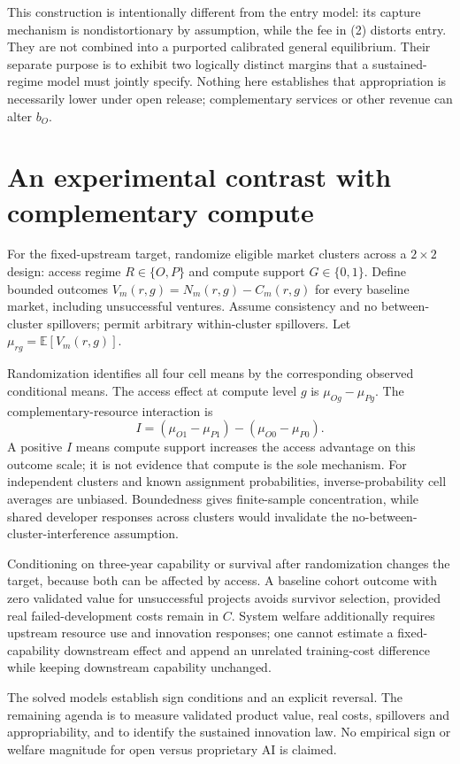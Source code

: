 \documentclass[11pt,a4paper]{article}
\newcommand{\E}{\mathbb E}
\begin{document}
This construction is intentionally different from the entry model: its capture mechanism is nondistortionary by assumption, while the fee in (2) distorts entry. They are not combined into a purported calibrated general equilibrium. Their separate purpose is to exhibit two logically distinct margins that a sustained-regime model must jointly specify. Nothing here establishes that appropriation is necessarily lower under open release; complementary services or other revenue can alter $b_O$.

\section{An experimental contrast with complementary compute}
For the fixed-upstream target, randomize eligible market clusters across a $2\times2$ design: access regime $R\in\{O,P\}$ and compute support $G\in\{0,1\}$. Define bounded outcomes $V_m(r,g)=N_m(r,g)-C_m(r,g)$ for every baseline market, including unsuccessful ventures. Assume consistency and no between-cluster spillovers; permit arbitrary within-cluster spillovers. Let $\mu_{rg}=\E[V_m(r,g)]$.

Randomization identifies all four cell means by the corresponding observed conditional means. The access effect at compute level $g$ is $\mu_{Og}-\mu_{Pg}$. The complementary-resource interaction is
\[
 I=(\mu_{O1}-\mu_{P1})-(\mu_{O0}-\mu_{P0}). \tag{4}
\]
A positive $I$ means compute support increases the access advantage on this outcome scale; it is not evidence that compute is the sole mechanism. For independent clusters and known assignment probabilities, inverse-probability cell averages are unbiased. Boundedness gives finite-sample concentration, while shared developer responses across clusters would invalidate the no-between-cluster-interference assumption.

Conditioning on three-year capability or survival after randomization changes the target, because both can be affected by access. A baseline cohort outcome with zero validated value for unsuccessful projects avoids survivor selection, provided real failed-development costs remain in $C$. System welfare additionally requires upstream resource use and innovation responses; one cannot estimate a fixed-capability downstream effect and append an unrelated training-cost difference while keeping downstream capability unchanged.

The solved models establish sign conditions and an explicit reversal. The remaining agenda is to measure validated product value, real costs, spillovers and appropriability, and to identify the sustained innovation law. No empirical sign or welfare magnitude for open versus proprietary AI is claimed.
\end{document}

